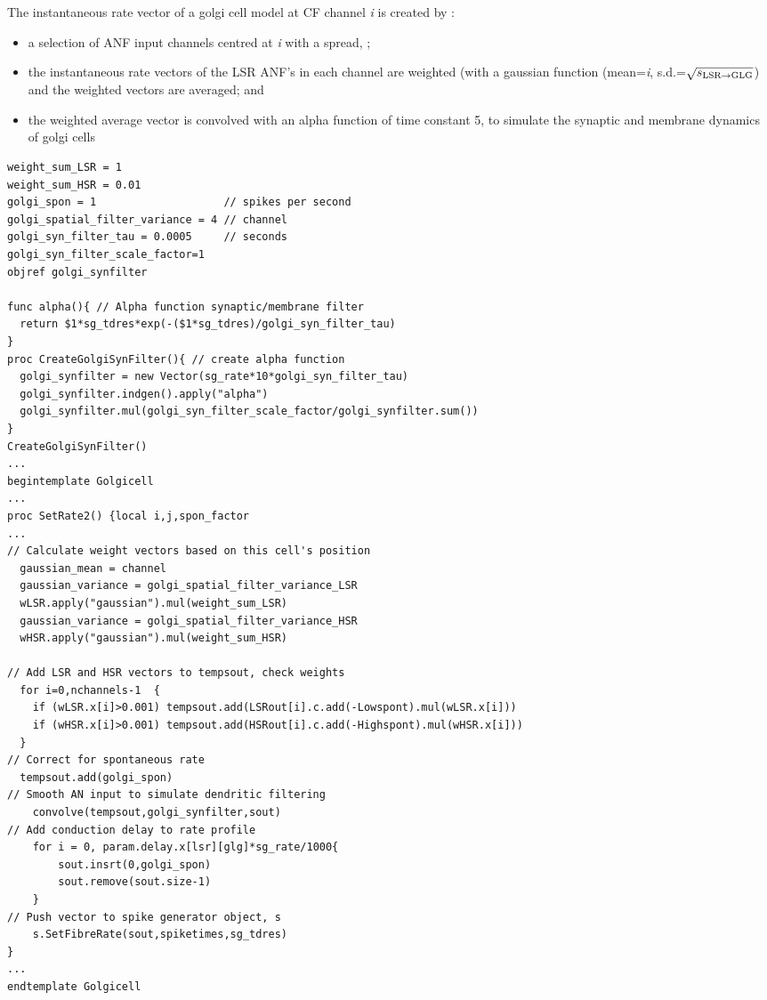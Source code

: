 The instantaneous rate vector of a golgi cell model at CF channel \emph{i} is
created by :
\begin{itemize}
\item a selection of ANF input channels centred at \emph{i} with a spread,
  \sLSRGLG;
\item the instantaneous rate vectors of the LSR ANF's in each channel are
  weighted (with a gaussian function (mean=\emph{i}, s.d.=$\sqrt{\protect s_{\protect\textrm{{LSR}}\to\textrm{{GLG}}}}$) and
  the weighted vectors are averaged; and
\item the weighted average vector is convolved with an alpha function of time
  constant 5, to simulate the synaptic and membrane dynamics of golgi cells
\end{itemize}

 \medskip{}

 \begin{lstlisting}[label=GolgiTemplate,caption=Create golgi cell rate vector
   within Golgi template (in CNcell.tem)]
weight_sum_LSR = 1
weight_sum_HSR = 0.01
golgi_spon = 1                    // spikes per second
golgi_spatial_filter_variance = 4 // channel 
golgi_syn_filter_tau = 0.0005     // seconds 
golgi_syn_filter_scale_factor=1
objref golgi_synfilter

func alpha(){ // Alpha function synaptic/membrane filter 
  return $1*sg_tdres*exp(-($1*sg_tdres)/golgi_syn_filter_tau)
}
proc CreateGolgiSynFilter(){ // create alpha function 
  golgi_synfilter = new Vector(sg_rate*10*golgi_syn_filter_tau)
  golgi_synfilter.indgen().apply("alpha")  
  golgi_synfilter.mul(golgi_syn_filter_scale_factor/golgi_synfilter.sum()) 
}
CreateGolgiSynFilter()
...
begintemplate Golgicell
...
proc SetRate2() {local i,j,spon_factor
...
// Calculate weight vectors based on this cell's position 
  gaussian_mean = channel
  gaussian_variance = golgi_spatial_filter_variance_LSR
  wLSR.apply("gaussian").mul(weight_sum_LSR)
  gaussian_variance = golgi_spatial_filter_variance_HSR
  wHSR.apply("gaussian").mul(weight_sum_HSR)

// Add LSR and HSR vectors to tempsout, check weights 
  for i=0,nchannels-1  {
    if (wLSR.x[i]>0.001) tempsout.add(LSRout[i].c.add(-Lowspont).mul(wLSR.x[i]))
    if (wHSR.x[i]>0.001) tempsout.add(HSRout[i].c.add(-Highspont).mul(wHSR.x[i]))
  }
// Correct for spontaneous rate 
  tempsout.add(golgi_spon)
// Smooth AN input to simulate dendritic filtering 
    convolve(tempsout,golgi_synfilter,sout)
// Add conduction delay to rate profile 
    for i = 0, param.delay.x[lsr][glg]*sg_rate/1000{
        sout.insrt(0,golgi_spon)
        sout.remove(sout.size-1)
    }
// Push vector to spike generator object, s 
    s.SetFibreRate(sout,spiketimes,sg_tdres)
}
...
endtemplate Golgicell
\end{lstlisting}


